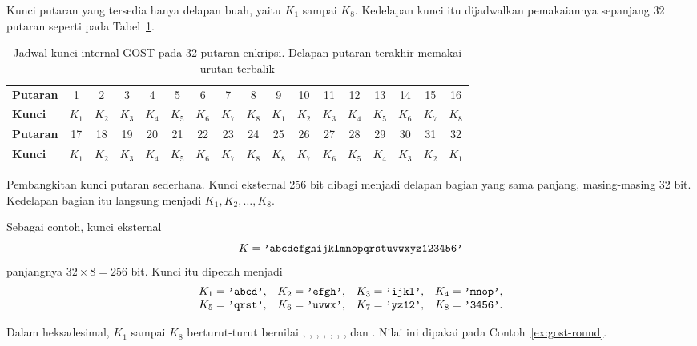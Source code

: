 Kunci putaran yang tersedia hanya delapan buah, yaitu $K_1$ sampai $K_8$. Kedelapan
kunci itu dijadwalkan pemakaiannya sepanjang 32 putaran seperti pada
Tabel~\ref{tab:jadwal-kunci-gost}.

\begin{table}[htbp]
    \centering
    \footnotesize
    \setlength{\tabcolsep}{4pt}
    \begin{tabular}{@{}l *{16}{c}@{}}
    \toprule
    \textbf{Putaran} & 1 & 2 & 3 & 4 & 5 & 6 & 7 & 8 & 9 & 10 & 11 & 12 & 13 & 14 & 15 & 16 \\
    \textbf{Kunci}   & $K_1$ & $K_2$ & $K_3$ & $K_4$ & $K_5$ & $K_6$ & $K_7$ & $K_8$
                     & $K_1$ & $K_2$ & $K_3$ & $K_4$ & $K_5$ & $K_6$ & $K_7$ & $K_8$ \\
    \midrule
    \textbf{Putaran} & 17 & 18 & 19 & 20 & 21 & 22 & 23 & 24 & 25 & 26 & 27 & 28 & 29 & 30 & 31 & 32 \\
    \textbf{Kunci}   & $K_1$ & $K_2$ & $K_3$ & $K_4$ & $K_5$ & $K_6$ & $K_7$ & $K_8$
                     & $K_8$ & $K_7$ & $K_6$ & $K_5$ & $K_4$ & $K_3$ & $K_2$ & $K_1$ \\
    \bottomrule
    \end{tabular}
    \caption{Jadwal kunci internal GOST pada 32 putaran enkripsi. Delapan putaran
    terakhir memakai urutan terbalik}
    \label{tab:jadwal-kunci-gost}
\end{table}

Pembangkitan kunci putaran sederhana. Kunci eksternal 256 bit dibagi menjadi
delapan bagian yang sama panjang, masing-masing 32 bit. Kedelapan bagian itu
langsung menjadi $K_1, K_2, \dots, K_8$.

Sebagai contoh, kunci eksternal
\[
K = \texttt{'abcdefghijklmnopqrstuvwxyz123456'}
\]
panjangnya $32 \times 8 = 256$ bit. Kunci itu dipecah menjadi
\[
\begin{array}{llll}
K_1 = \texttt{'abcd'}, & K_2 = \texttt{'efgh'}, & K_3 = \texttt{'ijkl'}, & K_4 = \texttt{'mnop'}, \\
K_5 = \texttt{'qrst'}, & K_6 = \texttt{'uvwx'}, & K_7 = \texttt{'yz12'}, & K_8 = \texttt{'3456'}.
\end{array}
\]

Dalam heksadesimal, $K_1$ sampai $K_8$ berturut-turut bernilai ,
, , , , ,
, dan . Nilai ini dipakai pada
Contoh~\ref{ex:gost-round}.


